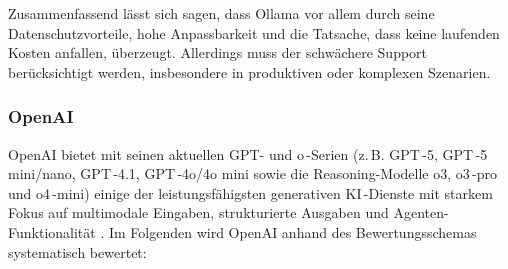      Zusammenfassend lässt sich sagen, dass Ollama vor allem durch seine Datenschutzvorteile, hohe Anpassbarkeit und die Tatsache, dass keine laufenden Kosten anfallen, überzeugt.
      Allerdings muss der schwächere Support berücksichtigt werden, insbesondere in produktiven oder komplexen Szenarien.

      \global\def\VOllamaAPI               {2}
      \global\def\VOllamaPerformance       {2}
      \global\def\VOllamaKosten            {3}
      \global\def\VOllamaAnpassung         {3}
      \global\def\VOllamaDatenschutz       {3}
      \global\def\VOllamaSupport           {1}
      \global\def\VOllamaDokumentation     {2}

    \subsubsection{OpenAI}

      OpenAI bietet mit seinen aktuellen GPT- und o\,-Serien (z.\,B. GPT\,-5, GPT\,-5 mini/nano, GPT\,-4.1, GPT\,-4o/4o mini sowie die Reasoning-Modelle o3, o3\,-pro und o4\,-mini) einige der leistungsfähigsten generativen \acs{KI}\,-Dienste mit starkem Fokus auf multimodale Eingaben, strukturierte Ausgaben und Agenten-Funktionalität \autocite{openai-docs}.
      Im Folgenden wird OpenAI anhand des Bewertungsschemas systematisch bewertet:

